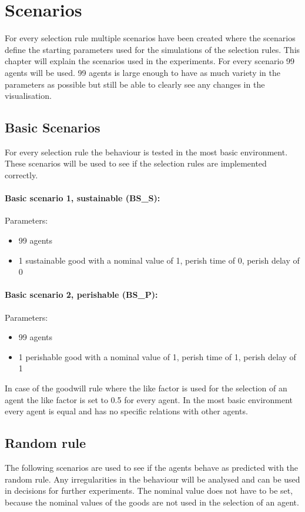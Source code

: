 \documentclass[twoside,openright]{uva-bachelor-thesis}
\begin{document}
\chapter{Scenarios}
For every selection rule multiple scenarios have been created where the scenarios define the starting parameters used for the simulations of the selection rules. This chapter will explain the scenarios used in the experiments. For every scenario 99 agents will be used. 99 agents is large enough to have as much variety in the parameters as possible but still be able to clearly see any changes in the visualisation. 

\section{Basic Scenarios}
For every selection rule the behaviour is tested in the most basic environment. These scenarios will be used to see if the selection rules are implemented correctly.

\subsubsection{Basic scenario 1, sustainable (BS\_S):}
Parameters:
\begin{itemize}
\item 99 agents
\item 1 sustainable good with a nominal value of 1, perish time of 0, perish delay of 0
\end{itemize}
\subsubsection{Basic scenario 2, perishable (BS\_P):}
Parameters:
\begin{itemize}
\item 99 agents
\item 1 perishable good with a nominal value of 1, perish time of 1, perish delay of 1
\end{itemize}
In case of the goodwill rule where the like factor is used for the selection of an agent the like factor is set to 0.5 for every agent. In the most basic environment every agent is equal and has no specific relations with other agents.

\section{Random rule}
The following scenarios are used to see if the agents behave as predicted with the random rule. Any irregularities in the behaviour will be analysed and can be used in decisions for further experiments. The nominal value does not have to be set, because the nominal values of the goods are not used in the selection of an agent.
\end{document}
